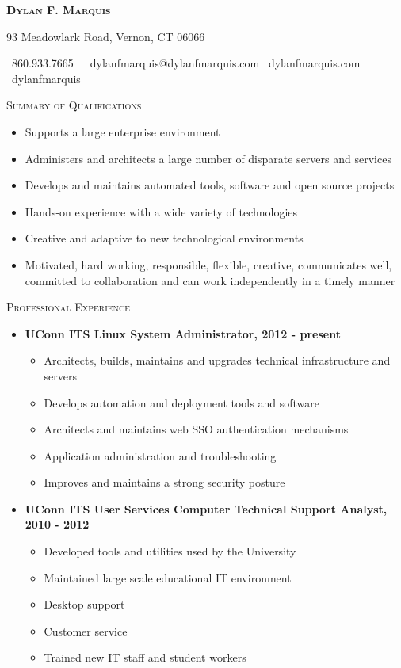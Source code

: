 \documentclass[11pt,letterpaper]{letter}
\newcommand*{\SectionTitle}[1]{
    \vspace{3mm}
    \textcolor{bluebook}{\textsc{\LARGE{{#1}}}}}
\begin{document}
 \begin{center}

  \textsc{\Huge{\textbf{Dylan F. Marquis}}} \\
  \vspace{3mm}

  \normalsize{\small{93 Meadowlark Road, Vernon, CT 06066}}

  \faMobile\ {860.933.7665}\ \ \faEnvelope\ {dylanfmarquis@dylanfmarquis.com} \faHome\ {dylanfmarquis.com} \faGithubSquare\ dylanfmarquis

  \noindent\makebox[\linewidth]{\rule{18cm}{0.400pt}}
 \end{center}

\SectionTitle{Summary of Qualifications}
\begin{itemize}
  \item Supports a large enterprise environment
  \item Administers and architects a large number of disparate servers and services
  \item Develops and maintains automated tools, software and open source projects
  \item Hands-on experience with a wide variety of technologies
  \item Creative and adaptive to new technological environments
  \item Motivated, hard working, responsible, flexible, creative, communicates well, committed to collaboration and can work independently in a timely manner
\end{itemize}

\SectionTitle{Professional Experience}
\begin{itemize}
  \item \textbf{UConn ITS Linux System Administrator, 2012 - present}
  \begin{itemize}
    \item Architects, builds, maintains and upgrades technical infrastructure and servers
    \item Develops automation and deployment tools and software
    \item Architects and maintains web SSO authentication mechanisms
    \item Application administration and troubleshooting
    \item Improves and maintains a strong security posture
  \end{itemize}
  \item \textbf{UConn ITS User Services Computer Technical Support Analyst, 2010 - 2012}
  \begin{itemize}
    \item Developed tools and utilities used by the University
    \item Maintained large scale educational IT environment
    \item Desktop support
    \item Customer service
    \item Trained new IT staff and student workers
  \end{itemize}
\end{itemize}
\end{document}

